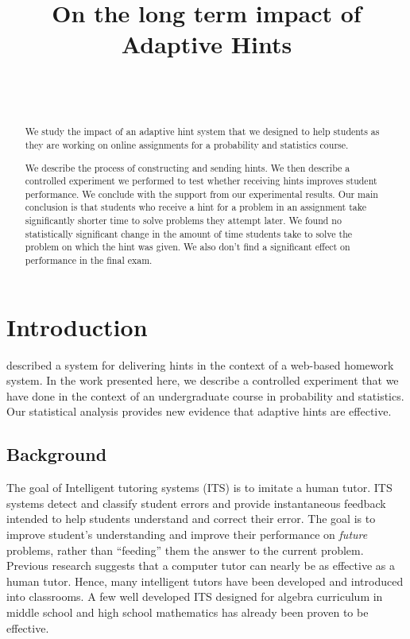 \documentclass{sigchi/sigchi}
\title{On the long term impact of Adaptive Hints}
\author{
  \alignauthor{Zhen Zhai\\
    \affaddr{UC San Diego}\\
    \email{zzhai@eng.ucsd.edu}}\\
  \alignauthor{Yoav Freund\\
    \affaddr{UC San Diego}\\
    \email{yfreund@eng.ucsd.edu}}\\
}
\begin{document}
\maketitle


\begin{abstract}

We study the impact of an adaptive hint system that we designed to help students as they are working on online assignments for a probability and statistics course.

We describe the process of constructing and sending hints. We then describe a controlled experiment we performed to test whether receiving hints improves student performance. We conclude with the support from our experimental results. Our main conclusion is that students who receive a hint for a problem in an assignment take significantly shorter time to solve problems they attempt later. We found no statistically significant change in the amount of time students take to solve the problem on which the hint was given. We also don't find a significant effect on performance in the final exam.

\end{abstract}


\section*{Introduction}

\cite{ElkherjFreund14} described a system for delivering hints in the context of a web-based homework system. In the work presented here, we describe a controlled experiment that we have done in the context of an undergraduate course in probability and statistics. Our statistical analysis provides new evidence that adaptive hints are effective.


\subsection*{Background}
The goal of Intelligent tutoring systems (ITS)\cite{Anderson1995} is to imitate a human tutor.  ITS systems detect and classify student errors and provide instantaneous feedback intended to help students
understand and correct their error. The goal is to improve
student's understanding and improve their performance on {\em future} problems, rather than ``feeding'' them the answer to the current problem.  Previous research suggests that a computer tutor can nearly be as effective as a human tutor\cite{Vanlehn2011}. Hence, many intelligent tutors have been developed and introduced into classrooms. A few well developed ITS designed for algebra curriculum in middle school and high school mathematics has already been proven
to be effective\cite{Koedinger1997, John2014}.
\end{document}
